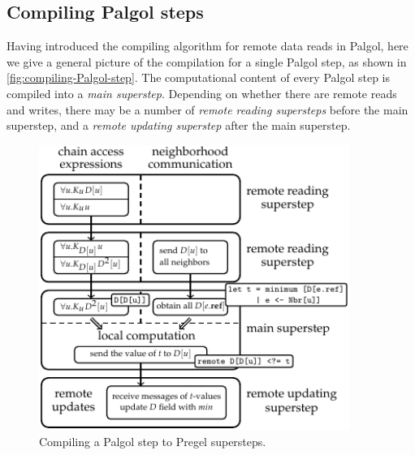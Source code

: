 \documentclass{sokendai_thesis} %
\begin{document}

\subsection{Compiling Palgol steps}
\label{sec:trans-step}

Having introduced the compiling algorithm for remote data reads in Palgol, here we give a general picture of the compilation for a single Palgol step, as shown in \autoref{fig:compiling-Palgol-step}.
The computational content of every Palgol step is compiled into a \emph{main superstep}.
Depending on whether there are remote reads and writes, there may be a number of \emph{remote reading supersteps} before the main superstep, and a \emph{remote updating superstep} after the main superstep.

\begin{figure}[t]
 \centering
 \includegraphics[width=0.9\textwidth]{figures/compile.pdf}
 \vspace{-2ex}
 \caption{Compiling a Palgol step to Pregel supersteps.}
 \label{fig:compiling-Palgol-step}
\end{figure}
\end{document}
